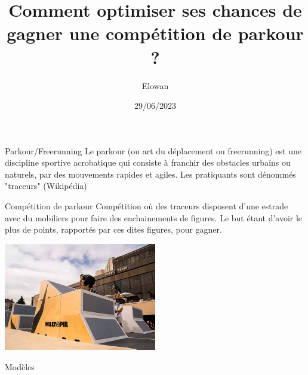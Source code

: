 \documentclass{beamer}
\title{Comment optimiser ses chances de gagner une compétition de parkour ?}
\author{Elowan}
\date{29/06/2023}
\begin{document}
\begin{frame}
\begin{block}{Parkour/Freerunning}
Le parkour (ou art du déplacement ou freerunning) est une discipline sportive acrobatique qui consiste à franchir des obstacles urbains ou naturels, par des mouvements rapides et agiles. Les pratiquants sont dénommés "traceurs" (Wikipédia)
\end{block}

\begin{block}{Compétition de parkour}
Compétition où des traceurs disposent d'une estrade avec du mobiliers pour faire des enchainements de figures. Le but étant d'avoir le plus de points, rapportés par ces dites figures, pour gagner.
\end{block}
\includegraphics[width=0.50\textwidth]{terrain.png}
\end{frame}

\begin{frame}{Modèles}
\end{frame}
\end{document}
